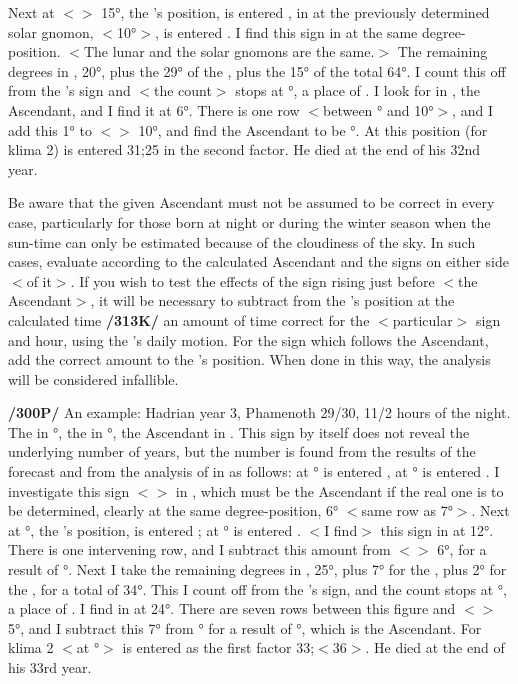 Next at $<$\Scorpio$>$ 15°, the \Moon’s position, is entered
\Virgo, in \Virgo\xspace at the previously determined solar gnomon, $<$10°$>$, is entered \Libra. I find this sign in \Aquarius\xspace at the same degree-position. $<$The lunar and the solar gnomons are the same.$>$ The remaining degrees in \Aquarius, 20°, plus the 29° of the \Sun, plus the 15° of the \Moon total 64°. I count this off from
the \Moon’s sign and $<$the count$>$ stops at \Capricorn\xspace 4°, a place of \Virgo. I look for \Virgo\xspace in \Aquarius, the Ascendant, and I find it at 6°. There is one row $<$between \Aquarius\xspace 6° and 10°$>$, and I add this 1° to $<$\Aquarius$>$ 10°, and find the Ascendant to be \Aquarius\xspace 11°. At this position (for klima 2) is entered 31;25 in the second factor. He died at the end of his 32nd year.

Be aware that the given Ascendant must not be assumed to be correct in every case, particularly for those born at night or during the winter season when the sun-time can only be estimated because of the cloudiness of the sky. In such cases, evaluate according to the calculated Ascendant and the signs on either side $<$of it$>$. If you wish to test the effects of the sign rising just before $<$the Ascendant$>$, it will be necessary to subtract from the \Moon’s position at the calculated time \textbf{/313K/} an amount of time correct for the $<$particular$>$ sign and hour, using the \Moon’s daily motion. For the sign which follows the Ascendant, add the correct amount to the \Moon’s position. When done in this way, the analysis will be considered infallible.

\textbf{/300P/} An example: Hadrian year 3, Phamenoth 29/30, 11/2 hours of the night. The \Sun\xspace in \Aries\xspace 7°, the \Moon\xspace in °, the Ascendant in \Scorpio. This sign by itself does not reveal the underlying number of years, but the number is found from the results of the forecast and from the analysis of \Sagittarius\xspace in \Scorpio\xspace as follows: at \Aries\xspace 7° is entered \Sagittarius, at \Sagittarius\xspace 7° is entered \Cancer. I investigate this sign $<$\Cancer$>$ in \Sagittarius, which must be the Ascendant if the real one is to be determined, clearly at the same degree-position, 6° $<$same row as 7°$>$. Next at \Pisces\xspace 2°, the \Moon’s position, is entered \Pisces; at \Pisces\xspace 6° is entered \Taurus. $<$I find$>$ this sign in \Sagittarius at 12°. There is one intervening row, and I subtract this amount from $<$\Sagittarius$>$ 6°, for a result of \Sagittarius\xspace 5°. Next I take the remaining degrees in \Sagittarius, 25°, plus 7° for the \Sun, plus 2° for the \Moon, for a total of 34°. This I count off from the \Moon’s sign, and the count stops at \Aries\xspace 4°, a place of \Capricorn. I find \Capricorn\xspace in \Sagittarius\xspace at 24°. There are seven rows between this figure and $<$\Sagittarius$>$ 5°, and I subtract this 7° from \Sagittarius\xspace 5° for a result of \Scorpio\xspace 28°, which is the Ascendant. For klima 2 $<$at \Scorpio\xspace 28°$>$ is entered as the first factor 33;$<$36$>$. He died at the end of his 33rd year.

